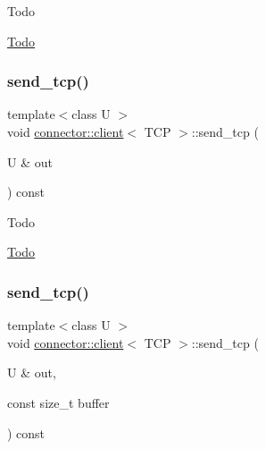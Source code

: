 \begin{DoxyRefDesc}{Todo}
\item[\hyperlink{todo__todo000003}{Todo}]\end{DoxyRefDesc}
\mbox{\label{classconnector_1_1client_3_01TCP_01_4_a71e97892c7765d1a156a364925ee1ca2}} 
\subsubsection{\texorpdfstring{send\+\_\+tcp()}{send\_tcp()}\hspace{0.1cm}{\footnotesize\ttfamily [1/2]}}
{\footnotesize\ttfamily template$<$class U $>$ \\
void \hyperlink{classconnector_1_1client}{connector\+::client}$<$ T\+CP $>$\+::send\+\_\+tcp (\begin{DoxyParamCaption}\item[{U \&}]{out }\end{DoxyParamCaption}) const\hspace{0.3cm}{\ttfamily [inline]}}

\begin{DoxyRefDesc}{Todo}
\item[\hyperlink{todo__todo000004}{Todo}]\end{DoxyRefDesc}
\mbox{\label{classconnector_1_1client_3_01TCP_01_4_ab61e009d01af8a21d138750ef0fceb47}} 
\subsubsection{\texorpdfstring{send\+\_\+tcp()}{send\_tcp()}\hspace{0.1cm}{\footnotesize\ttfamily [2/2]}}
{\footnotesize\ttfamily template$<$class U $>$ \\
void \hyperlink{classconnector_1_1client}{connector\+::client}$<$ T\+CP $>$\+::send\+\_\+tcp (\begin{DoxyParamCaption}\item[{U \&}]{out,  }\item[{const size\+\_\+t}]{buffer }\end{DoxyParamCaption}) const\hspace{0.3cm}{\ttfamily [inline]}}


